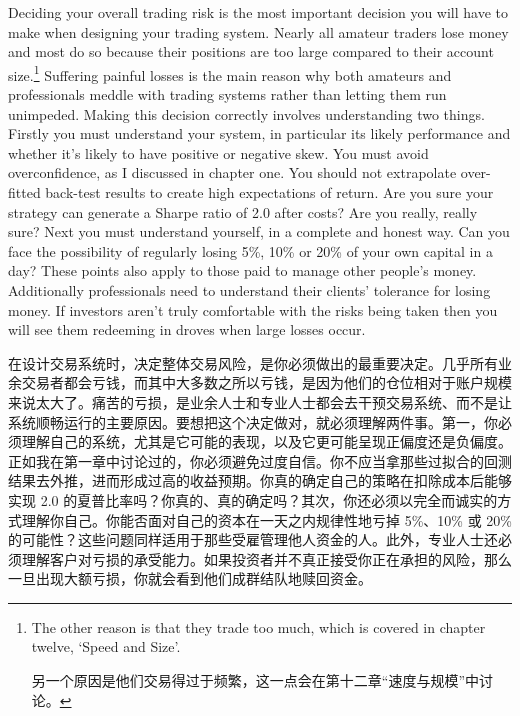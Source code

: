 
\begin{englishblock} Deciding your overall trading risk is the most important decision you will have to make when designing your trading system. Nearly all amateur traders lose money and most do so because their positions are too large compared to their account size.\footnote{The other reason is that they trade too much, which is covered in chapter twelve, ‘Speed and Size'. \par 另一个原因是他们交易得过于频繁，这一点会在第十二章“速度与规模”中讨论。} Suffering painful losses is the main reason why both amateurs and professionals meddle with trading systems rather than letting them run unimpeded. Making this decision correctly involves understanding two things. Firstly you must understand your system, in particular its likely performance and whether it's likely to have positive or negative skew. You must avoid overconfidence, as I discussed in chapter one. You should not extrapolate over-fitted back-test results to create high expectations of return. Are you sure your strategy can generate a Sharpe ratio of 2.0 after costs? Are you really, really sure? Next you must understand yourself, in a complete and honest way. Can you face the possibility of regularly losing 5\%, 10\% or 20\% of your own capital in a day? These points also apply to those paid to manage other people's money. Additionally professionals need to understand their clients' tolerance for losing money. If investors aren't truly comfortable with the risks being taken then you will see them redeeming in droves when large losses occur. \end{englishblock}

\begin{chineseblock}在设计交易系统时，决定整体交易风险，是你必须做出的最重要决定。几乎所有业余交易者都会亏钱，而其中大多数之所以亏钱，是因为他们的仓位相对于账户规模来说太大了。痛苦的亏损，是业余人士和专业人士都会去干预交易系统、而不是让系统顺畅运行的主要原因。要想把这个决定做对，就必须理解两件事。第一，你必须理解自己的系统，尤其是它可能的表现，以及它更可能呈现正偏度还是负偏度。正如我在第一章中讨论过的，你必须避免过度自信。你不应当拿那些过拟合的回测结果去外推，进而形成过高的收益预期。你真的确定自己的策略在扣除成本后能够实现 2.0 的夏普比率吗？你真的、真的确定吗？其次，你还必须以完全而诚实的方式理解你自己。你能否面对自己的资本在一天之内规律性地亏掉 5\%、10\% 或 20\% 的可能性？这些问题同样适用于那些受雇管理他人资金的人。此外，专业人士还必须理解客户对亏损的承受能力。如果投资者并不真正接受你正在承担的风险，那么一旦出现大额亏损，你就会看到他们成群结队地赎回资金。\end{chineseblock}

